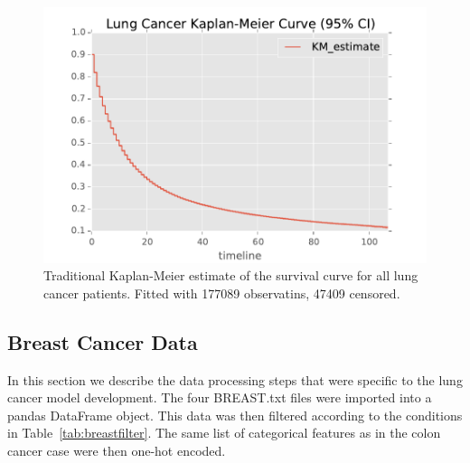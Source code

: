 \documentclass[a4paper,11pt]{article}
\begin{document}
\begin{figure}[tbp]
\centering 
\begin{center}
\includegraphics[width=.90\textwidth,origin=c]{lungkaplan.pdf}
\caption{\label{fig:lungkaplan} Traditional Kaplan-Meier estimate of the survival curve for all lung cancer patients. Fitted with 177089 observatins, 47409 censored.}
\end{center}
\end{figure}



\subsection{Breast Cancer Data}
\label{subsec:breastcancerdata}

In this section we describe the data processing steps that were specific to the lung cancer model development. The four BREAST.txt files were imported into a pandas DataFrame object.
This data was then filtered according to the conditions in Table~\ref{tab:breastfilter}.
The same list of categorical features as in the colon cancer case were then one-hot encoded.
\end{document}
